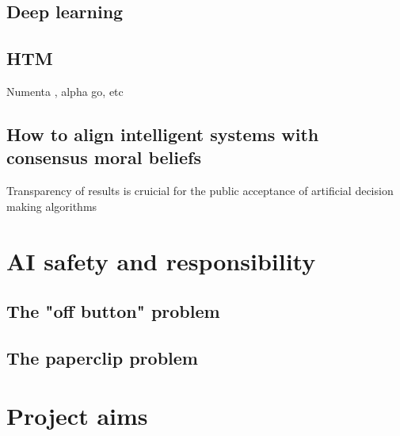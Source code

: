 \subsection{Deep learning}
\subsection{HTM}
Numenta \cite{numentahome}, alpha go, etc
\subsection{How to align intelligent systems with consensus moral beliefs}
Transparency of results is cruicial for the public acceptance of artificial decision making algorithms 

\section{AI safety and responsibility}
\subsection{The "off button" problem}
\subsection{The paperclip problem}

\section{Project aims}
